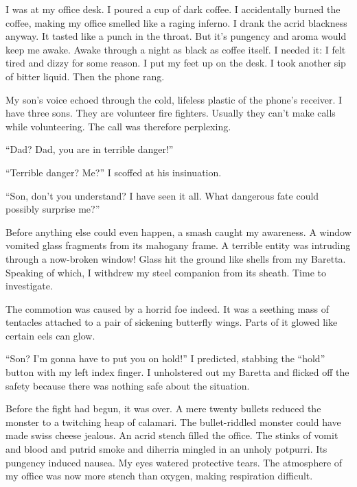 I was at my office desk. I poured a cup of dark coffee. I
accidentally burned the coffee, making my office smelled like a
raging inferno. I drank the acrid blackness anyway. It tasted like
a punch in the throat. But it's pungency and aroma would keep
me awake. Awake through a night as black as coffee itself. I needed
it: I felt tired and dizzy for some reason. I put my feet up on the
desk. I took another sip of bitter liquid. Then the phone
rang.



My son's voice echoed through the cold, lifeless plastic of
the phone's receiver. I have three sons. They are volunteer
fire fighters. Usually they can't make calls while
volunteering. The call was therefore perplexing.



``Dad? Dad, you are in terrible danger!''

``Terrible danger? Me?'' I scoffed at his
insinuation.

``Son, don't you understand? I have seen it all. What
dangerous fate could possibly surprise me?''



Before anything else could even happen, a smash caught my
awareness. A window vomited glass fragments from its mahogany
frame. A terrible entity was intruding through a now-broken window!
Glass hit the ground like shells from my Baretta. Speaking of
which, I withdrew my steel companion from its sheath. Time to
investigate.



The commotion was caused by a horrid foe indeed. It was a seething
mass of tentacles attached to a pair of sickening butterfly wings.
Parts of it glowed like certain eels can glow.



``Son? I'm gonna have to put you on hold!'' I
predicted, stabbing the ``hold'' button with my left
index finger. I unholstered out my Baretta and flicked off the
safety because there was nothing safe about the situation.



Before the fight had begun, it was over. A mere twenty bullets
reduced the monster to a twitching heap of calamari. The
bullet-riddled monster could have made swiss cheese jealous. An
acrid stench filled the office. The stinks of vomit and blood and
putrid smoke and diherria mingled in an unholy potpurri. Its
pungency induced nausea. My eyes watered protective tears. The
atmosphere of my office was now more stench than oxygen, making
respiration difficult.



